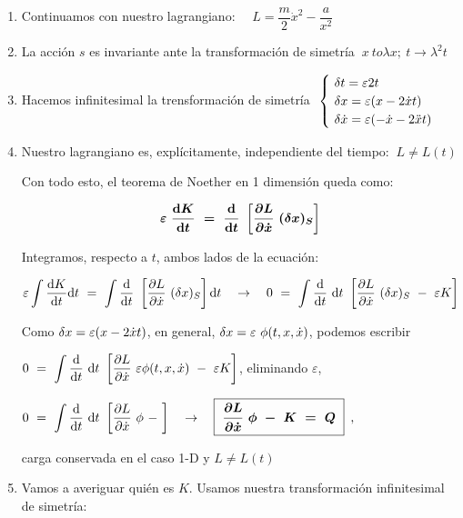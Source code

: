 \begin{enumerate}
\item Continuamos con nuestro lagrangiano:	$\quad L=\dfrac m 2 \dot x^2 - \dfrac {a}{x^2}$
\item La acción  $s$ es invariante ante la transformación de simetría $\ x\ to \lambda x;\ t\to \lambda^2 t$
\item Hacemos infinitesimal la trensformación de simetría $\ \begin{cases}
 	\ \var t=\varepsilon 2 t \\ \ \var x=\varepsilon (x-2\dot x t) \\ \ \var \dot x = \varepsilon (-\dot x - 2\ddot x t)
 \end{cases}$
 \item Nuestro lagrangiano es, explícitamente, independiente del tiempo: $\ L \neq L(t)$
 
\vspace{5mm} Con todo esto, el teorema de Noether en 1 dimensión queda como:
 
 $$\boldsymbol{\varepsilon \ \displaystyle \dv{K}{t} \ = \ \dv{t} \ \left[ \pdv{L}{\dot x} \ (\var x)_S \right]} $$
 
Integramos, respecto a $t$, ambos lados de la ecuación:
 
\vspace{2mm} $\displaystyle \varepsilon \int \dv{K}{t} \dd t \ = \ \int\dv{t} \ \left[ \pdv{L}{\dot x} \ (\var x)_S \right]\dd t  \quad \to \quad 
0\ =\ \int\dv{t} \ \dd t \ \left[ \pdv{L}{\dot x} \ (\var x)_S  \ - \ \varepsilon K \right]$
  
\vspace{2mm}\vspace{2mm} Como $\var x=\varepsilon (x-2\dot x t)$, en general, $\var x=\varepsilon \ \phi(t,x,\dot x)$, podemos escribir

\vspace{2mm}$\displaystyle 0\ =\ \int\dv{t} \ \dd t \ \left[ \pdv{L}{\dot x} \ \varepsilon \phi(t,x,\dot x)  \ - \ \varepsilon K \right]$, eliminando $\varepsilon$,

\vspace{2mm}$\displaystyle 0\ =\ \int\dv{t} \ \dd t \ \left[ \pdv{L}{\dot x} \ \phi  \ - \  \right] \quad \to \quad
\boxed{\ \boldsymbol{ \pdv{L}{\dot x}\ \phi \ - \ K \ = \ Q } \ } \ \, , \ $ \begin{footnotesize} carga conservada en el caso 1-D y $L\neq L(t)$ \end{footnotesize}
\vspace{2mm}
\item Vamos a averiguar quién es $K$. Usamos nuestra transformación infinitesimal de simetría: 


\end{enumerate}
